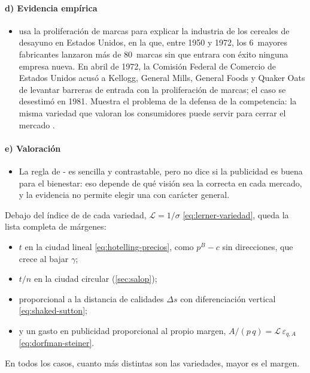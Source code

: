 \documentclass[11pt]{article}
\begin{document}
\paragraph{d) Evidencia empírica}

\begin{itemize}
\item \textcite{Schmalensee1978Entry} usa la proliferación de marcas para explicar la industria de los cereales de desayuno en Estados Unidos, en la que, entre 1950 y 1972, los 6~mayores fabricantes lanzaron más de 80~marcas sin que entrara con éxito ninguna empresa nueva\nocite{Schmalensee1977Entry,Schmalensee1978Entry}. En abril de 1972, la Comisión Federal de Comercio de Estados Unidos acusó a Kellogg, General Mills, General Foods y Quaker Oats de levantar barreras de entrada con la proliferación de marcas; el caso se desestimó en 1981\nocite{Schmalensee1977Entry,Schmalensee1978Entry}. Muestra el problema de la defensa de la competencia: la misma variedad que valoran los consumidores puede servir para cerrar el mercado  .
\end{itemize}

\paragraph{e) Valoración}

\begin{itemize}
\item La regla de - es sencilla y contrastable, pero no dice si la publicidad es buena para el bienestar: eso depende de qué visión sea la correcta en cada mercado, y la evidencia no permite elegir una con carácter general\nocite{Bagwell2007Economic}.
\end{itemize}

\begin{ideaclave}
Debajo del índice de  de cada variedad, $\mathcal{L}=1/\sigma$ \eqref{eq:lerner-variedad}, queda la lista completa de márgenes:
\begin{itemize}
\item $t$ en la ciudad lineal \eqref{eq:hotelling-precios}, como $p^B-c$ sin direcciones, que crece al bajar $\gamma$;
\item $t/n$ en la ciudad circular (\ref{sec:salop});
\item proporcional a la distancia de calidades $\Delta s$ con diferenciación vertical \eqref{eq:shaked-sutton};
\item y un gasto en publicidad proporcional al propio margen, $A/(p\,q)=\mathcal{L}\,\varepsilon_{q,A}$ \eqref{eq:dorfman-steiner}.
\end{itemize}
En todos los casos, cuanto más distintas son las variedades, mayor es el margen.
\end{ideaclave}
\end{document}
